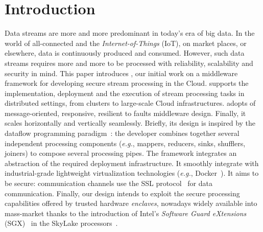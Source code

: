 \section{Introduction}
\label{sec:introduction}


Data streams are more and more predominant in today's era of big data.
In the world of all-connected and the \emph{Internet-of-Things} (IoT), on market places, or elsewhere, data is continuously produced and consumed.
However, such data streams requires more and more to be processed with reliability, scalability and security in mind.
This paper introduces \SYS{}, our initial work on a middleware framework for developing secure stream processing in the Cloud.
\SYS{} supports the implementation, deployment and the execution of stream processing tasks in distributed settings, from clusters to large-scale Cloud infrastructures.
\SYS{} adopts of message-oriented, responsive, resilient to faults middleware design.
Finally, it scales horizontally and vertically seamlessly.
Briefly, its design is inspired by the dataflow programming paradigm~\cite{uustalu_essence_2005}: the developer combines together several independent processing components (\emph{e.g.}, mappers, reducers, sinks, shufflers, joiners) to compose several processing pipes.%
The framework integrates an abstraction of the required deployment infrastructure.
It smoothly integrate with industrial-grade lightweight virtualization technologies (\emph{e.g.}, Docker~\cite{docker}).
It aims to be secure: communication channels use the SSL protocol~\cite{freier2011secure} for data communication.
Finally, our design intends to exploit the secure processing capabilities offered by trusted hardware \emph{enclaves}, nowadays widely available into mass-market thanks to the introduction of Intel's \emph{Software Guard eXtensions} (SGX)~\cite{costan_intel} in the SkyLake processors~\cite{skylake}.

